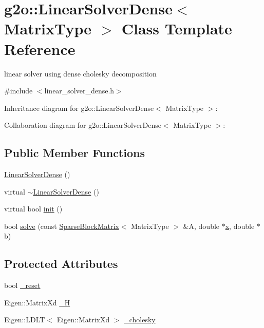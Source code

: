 \hypertarget{classg2o_1_1LinearSolverDense}{}\section{g2o\+:\+:Linear\+Solver\+Dense$<$ Matrix\+Type $>$ Class Template Reference}
\label{classg2o_1_1LinearSolverDense}


linear solver using dense cholesky decomposition  




{\ttfamily \#include $<$linear\+\_\+solver\+\_\+dense.\+h$>$}



Inheritance diagram for g2o\+:\+:Linear\+Solver\+Dense$<$ Matrix\+Type $>$\+:


Collaboration diagram for g2o\+:\+:Linear\+Solver\+Dense$<$ Matrix\+Type $>$\+:
\subsection*{Public Member Functions}
\begin{DoxyCompactItemize}
\item 
\hyperlink{classg2o_1_1LinearSolverDense_a25d8767ad60e944d8518348a136830da}{Linear\+Solver\+Dense} ()
\item 
virtual \hyperlink{classg2o_1_1LinearSolverDense_a2b3cbb77fa958bf322b98e38ec3e29c2}{$\sim$\+Linear\+Solver\+Dense} ()
\item 
virtual bool \hyperlink{classg2o_1_1LinearSolverDense_a24f68ecd4b022269dbfc4d990eb5c57b}{init} ()
\item 
bool \hyperlink{classg2o_1_1LinearSolverDense_a8b6eafa6e53b9f705a4e8eb436eeb403}{solve} (const \hyperlink{classg2o_1_1SparseBlockMatrix}{Sparse\+Block\+Matrix}$<$ Matrix\+Type $>$ \&A, double $\ast$\hyperlink{sparse__helper_8cpp_af88b946fb90d5f08b5fb740c70e98c10}{x}, double $\ast$b)
\end{DoxyCompactItemize}
\subsection*{Protected Attributes}
\begin{DoxyCompactItemize}
\item 
bool \hyperlink{classg2o_1_1LinearSolverDense_a2d82ac52c9c24501cccee3ef3cb575fe}{\+\_\+reset}
\item 
Eigen\+::\+Matrix\+Xd \hyperlink{classg2o_1_1LinearSolverDense_a5ca6a1f2358ce0620dbdbae3fdc9fc99}{\+\_\+H}
\item 
Eigen\+::\+L\+D\+LT$<$ Eigen\+::\+Matrix\+Xd $>$ \hyperlink{classg2o_1_1LinearSolverDense_a20fc35e2f25107a6e36211861034aae0}{\+\_\+cholesky}
\end{DoxyCompactItemize}


